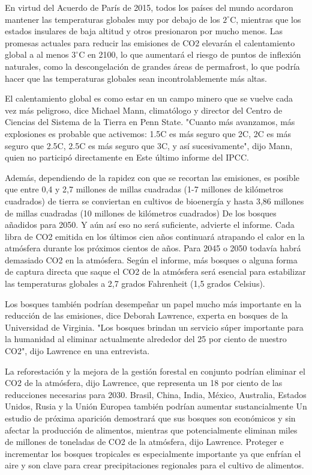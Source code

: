 \documentclass[12pt,a4paper]{article}
\begin{document}
\noindent En virtud del Acuerdo de París de 2015, todos los países del mundo acordaron mantener las temperaturas globales muy por debajo de los $2^{\circ} $C, mientras que los estados insulares de baja altitud y otros presionaron por mucho menos. Las promesas actuales para reducir las emisiones de CO2 elevarán el calentamiento global a al menos $3^{\circ} $C en 2100, lo que aumentará el riesgo de puntos de inflexión naturales, como la descongelación de grandes áreas de permafrost, lo que podría hacer que las temperaturas globales sean incontrolablemente más altas.

\noindent El calentamiento global es como estar en un campo minero que se vuelve cada vez más peligroso, dice Michael Mann, climatólogo y director del Centro de Ciencias del Sistema de la Tierra en Penn State. "Cuanto más avanzamos, más explosiones es probable que activemos: 1.5C es más seguro que 2C, 2C es más seguro que 2.5C, 2.5C es más seguro que 3C, y así sucesivamente", dijo Mann, quien no participó directamente en Este último informe del IPCC.

\noindent Además, dependiendo de la rapidez con que se recortan las emisiones, es posible que entre 0,4 y 2,7 millones de millas cuadradas (1-7 millones de kilómetros cuadrados) de tierra se conviertan en cultivos de bioenergía y hasta 3,86 millones de millas cuadradas (10 millones de kilómetros cuadrados) De los bosques añadidos para 2050. Y aún así eso no será suficiente, advierte el informe. Cada libra de CO2 emitida en los últimos cien años continuará atrapando el calor en la atmósfera durante los próximos cientos de años. Para 2045 o 2050 todavía habrá demasiado CO2 en la atmósfera. Según el informe, más bosques o alguna forma de captura directa que saque el CO2 de la atmósfera será esencial para estabilizar las temperaturas globales a 2,7 grados Fahrenheit (1,5 grados Celsius).

\noindent Los bosques también podrían desempeñar un papel mucho más importante en la reducción de las emisiones, dice Deborah Lawrence, experta en bosques de la Universidad de Virginia. "Los bosques brindan un servicio súper importante para la humanidad al eliminar actualmente alrededor del 25 por ciento de nuestro CO2", dijo Lawrence en una entrevista.

\noindent La reforestación y la mejora de la gestión forestal en conjunto podrían eliminar el CO2 de la atmósfera, dijo Lawrence, que representa un 18 por ciento de las reducciones necesarias para 2030. Brasil, China, India, México, Australia, Estados Unidos, Rusia y la Unión Europea también podrían aumentar sustancialmente Un estudio de próxima aparición demostrará que sus bosques son económicos y sin afectar la producción de alimentos, mientras que potencialmente eliminan miles de millones de toneladas de CO2 de la atmósfera, dijo Lawrence. Proteger e incrementar los bosques tropicales es especialmente importante ya que enfrían el aire y son clave para crear precipitaciones regionales para el cultivo de alimentos.
\end{document}
